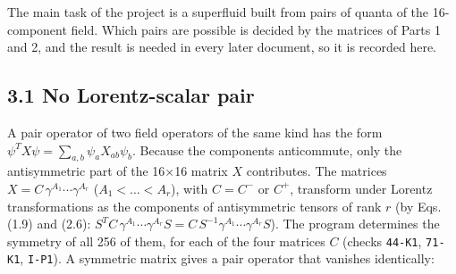 \documentclass[
  10pt,
]{article}
\begin{document}
The main task of the project is a superfluid built from pairs of quanta
of the 16-component field. Which pairs are possible is decided by the
matrices of Parts 1 and 2, and the result is needed in every later
document, so it is recorded here.

\hypertarget{no-lorentz-scalar-pair}{%
\subsection{3.1 No Lorentz-scalar pair}\label{no-lorentz-scalar-pair}}

A pair operator of two field operators of the same kind has the form
\(\psi^TX\psi=\sum_{a,b}\psi_aX_{ab}\psi_b\). Because the components
anticommute, only the antisymmetric part of the 16×16 matrix \(X\)
contributes. The matrices \(X=C\,\gamma^{A_1}\cdots\gamma^{A_r}\)
(\(A_1<\dots<A_r\)), with \(C=C^{-}\) or \(C^{+}\), transform under
Lorentz transformations as the components of antisymmetric tensors of
rank \(r\) (by Eqs. (1.9) and (2.6):
\(S^TC\,\gamma^{A_1}\cdots\gamma^{A_r}S=C\,S^{-1}\gamma^{A_1}\cdots\gamma^{A_r}S\)).
The program determines the symmetry of all 256 of them, for each of the
four matrices \(C\) (checks \texttt{44-K1}, \texttt{71-K1},
\texttt{I-P1}). A symmetric matrix gives a pair operator that vanishes
identically:
\end{document}
